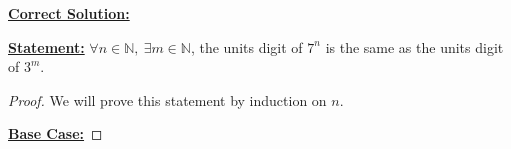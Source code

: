 \documentclass[12pt]{article}
\begin{document}
\begin{itemize}












    \bigskip

    \begin{mdframed}
        \underline{\textbf{Correct Solution:}}

        \bigskip

        \underline{\textbf{Statement:}} $\forall n \in \mathbb{N},\:\exists m \in \mathbb{N}$,
        the units digit of $7^n$ is the same as the units digit of $3^m$.

        \bigskip

        \begin{proof}

        We will prove this statement by induction on $n$.

        \bigskip

        \underline{\textbf{Base Case:}}


\end{proof}
\end{mdframed}
\end{itemize}
\end{document}
